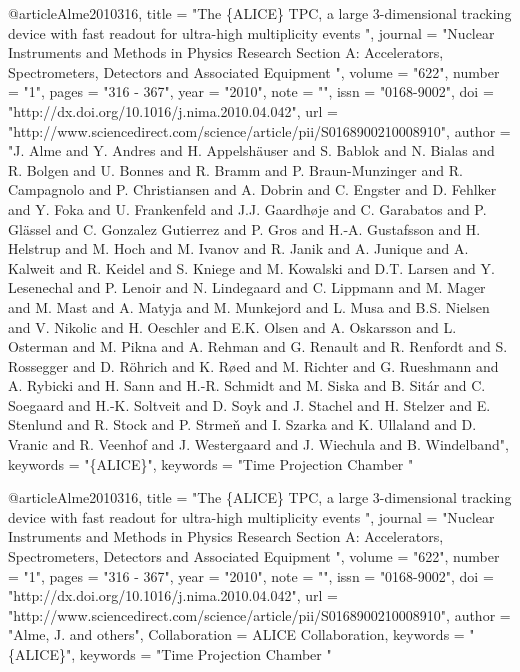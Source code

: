 @article{Alme2010316,
title = "The \{ALICE\} TPC, a large 3-dimensional tracking device with fast readout for ultra-high multiplicity events ",
journal = "Nuclear Instruments and Methods in Physics Research Section A: Accelerators, Spectrometers, Detectors and Associated Equipment ",
volume = "622",
number = "1",
pages = "316 - 367",
year = "2010",
note = "",
issn = "0168-9002",
doi = "http://dx.doi.org/10.1016/j.nima.2010.04.042",
url = "http://www.sciencedirect.com/science/article/pii/S0168900210008910",
author = "J. Alme and Y. Andres and H. Appelshäuser and S. Bablok and N. Bialas and R. Bolgen and U. Bonnes and R. Bramm and P. Braun-Munzinger and R. Campagnolo and P. Christiansen and A. Dobrin and C. Engster and D. Fehlker and Y. Foka and U. Frankenfeld and J.J. Gaardhøje and C. Garabatos and P. Glässel and C. Gonzalez Gutierrez and P. Gros and H.-A. Gustafsson and H. Helstrup and M. Hoch and M. Ivanov and R. Janik and A. Junique and A. Kalweit and R. Keidel and S. Kniege and M. Kowalski and D.T. Larsen and Y. Lesenechal and P. Lenoir and N. Lindegaard and C. Lippmann and M. Mager and M. Mast and A. Matyja and M. Munkejord and L. Musa and B.S. Nielsen and V. Nikolic and H. Oeschler and E.K. Olsen and A. Oskarsson and L. Osterman and M. Pikna and A. Rehman and G. Renault and R. Renfordt and S. Rossegger and D. Röhrich and K. Røed and M. Richter and G. Rueshmann and A. Rybicki and H. Sann and H.-R. Schmidt and M. Siska and B. Sitár and C. Soegaard and H.-K. Soltveit and D. Soyk and J. Stachel and H. Stelzer and E. Stenlund and R. Stock and P. Strmeň and I. Szarka and K. Ullaland and D. Vranic and R. Veenhof and J. Westergaard and J. Wiechula and B. Windelband",
keywords = "\{ALICE\}",
keywords = "Time Projection Chamber "
}

@article{Alme2010316,
title = "The \{ALICE\} TPC, a large 3-dimensional tracking device with fast readout for ultra-high multiplicity events ",
journal = "Nuclear Instruments and Methods in Physics Research Section A: Accelerators, Spectrometers, Detectors and Associated Equipment ",
volume = "622",
number = "1",
pages = "316 - 367",
year = "2010",
note = "",
issn = "0168-9002",
doi = "http://dx.doi.org/10.1016/j.nima.2010.04.042",
url = "http://www.sciencedirect.com/science/article/pii/S0168900210008910",
author = "Alme, J. and others",
Collaboration = {ALICE Collaboration},
keywords = "\{ALICE\}",
keywords = "Time Projection Chamber "
}


